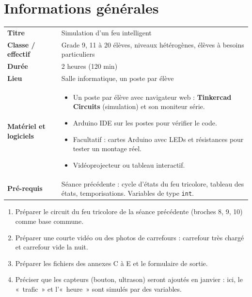 \documentclass[11pt,a4paper]{article}
\begin{document}

\section{Informations générales}
\begin{tabularx}{\linewidth}{>{\bfseries}p{3.6cm}Y}
\toprule
Titre & Simulation d'un feu intelligent\\
Classe / effectif & Grade 9, 11 à 20 élèves, niveaux hétérogènes, élèves à besoins particuliers\\
Durée & 2 heures (120 min)\\
Lieu & Salle informatique, un poste par élève\\
Matériel et logiciels &
\begin{itemize}
 \item Un poste par élève avec navigateur web : \textbf{Tinkercad Circuits} (simulation) et son moniteur série.
 \item Arduino IDE sur les postes pour vérifier le code.
 \item Facultatif : cartes Arduino avec LEDs et résistances pour tester un montage réel.
 \item Vidéoprojecteur ou tableau interactif.
\end{itemize}\\
Pré-requis &
Séance précédente : cycle d'états du feu tricolore, tableau des états, temporisations. Variables de type \texttt{int}.\\
\bottomrule
\end{tabularx}

\begin{astuce}
\begin{enumerate}
 \item Préparer le circuit du feu tricolore de la séance précédente (broches 8, 9, 10) comme base commune.
 \item Préparer une courte vidéo ou des photos de carrefours : carrefour très chargé et carrefour vide la nuit.
 \item Préparer les fichiers des annexes C à E et le formulaire de sortie.
 \item Préciser que les capteurs (bouton, ultrason) seront ajoutés en janvier : ici, le «~trafic~» et l'«~heure~» sont simulés par des variables.
\end{enumerate}
\end{astuce}
\end{document}
